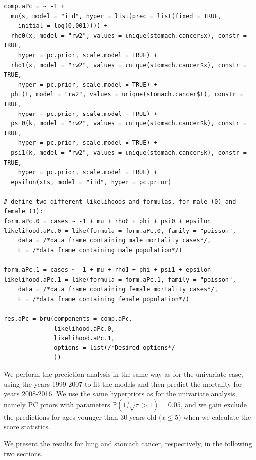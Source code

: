 \begin{verbatim}
comp.aPc = ~ -1 + 
  mu(s, model = "iid", hyper = list(prec = list(fixed = TRUE,
    initial = log(0.001)))) +
  rho0(x, model = "rw2", values = unique(stomach.cancer$x), constr = TRUE,
    hyper = pc.prior, scale.model = TRUE) + 
  rho1(x, model = "rw2", values = unique(stomach.cancer$x), constr = TRUE,
    hyper = pc.prior, scale.model = TRUE) + 
  phi(t, model = "rw2", values = unique(stomach.cancer$t), constr = TRUE,
    hyper = pc.prior, scale.model = TRUE) + 
  psi0(k, model = "rw2", values = unique(stomach.cancer$k), constr = TRUE,
    hyper = pc.prior, scale.model = TRUE) + 
  psi1(k, model = "rw2", values = unique(stomach.cancer$k), constr = TRUE,
    hyper = pc.prior, scale.model = TRUE) + 
  epsilon(xts, model = "iid", hyper = pc.prior)

# define two different likelihoods and formulas, for male (0) and female (1):
form.aPc.0 = cases ~ -1 + mu + rho0 + phi + psi0 + epsilon
likelihood.aPc.0 = like(formula = form.aPc.0, family = "poisson",
    data = /*data frame containing male mortality cases*/,
    E = /*data frame containing male population*/)

form.aPc.1 = cases ~ -1 + mu + rho1 + phi + psi1 + epsilon
likelihood.aPc.1 = like(formula = form.aPc.1, family = "poisson",
    data = /*data frame containing female mortality cases*/,
    E = /*data frame containing female population*/)

res.aPc = bru(components = comp.aPc,
              likelihood.aPc.0,
              likelihood.aPc.1,
              options = list(/*Desired options*/
              )) 
\end{verbatim}
\newpar We perform the preciction analysis in the same way as for the univariate case, using the years 1999-2007 to fit the models and then predict the mortality for years 2008-2016. We use the same hyperpriors as for the univariate analysis, namely PC priors with parameters $\mathbb{P}(1/\sqrt{\tau} > 1) = 0.05$, and we gain exclude the predictions for ages younger than 30 years old ($x \leq 5$) when we calculate the score statistics.

We present the results for lung and stomach cancer, respectively, in the following two sections.

